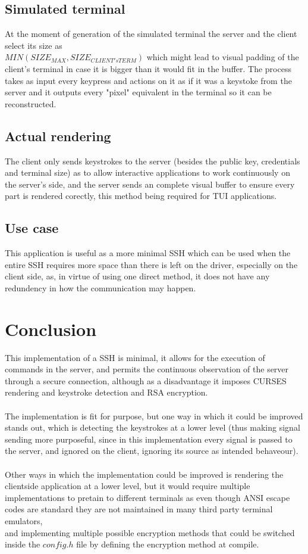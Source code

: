 \documentclass{article}
\begin{document}
    \subsection{Simulated terminal} 
    At the moment of generation of the simulated terminal the server and the client select its size as \\$MIN(SIZE_{MAX}, SIZE_{CLIENT'sTERM})$ which might lead to visual padding of the client's terminal in case it is bigger than it would fit in the buffer. 
    The process takes as input every keypress and actions on it as if it was a keystoke from the server and it outputs every "pixel" equivalent in the terminal so it can be reconstructed.
    \subsection{Actual rendering}
    The client only sends keystrokes to the server (besides the public key, credentials and terminal size) as to allow interactive applications to work continuously on the server's side, and the server sends an complete visual buffer to ensure every part is rendered corectly, this method being required for TUI applications.
    \subsection{Use case}
    This application is useful as a more minimal SSH which can be used when the entire SSH requires more space than there is left on the driver, especially on the client side, as, in virtue of using one direct method, it does not have any redundency in how the communication may happen.

    \section{Conclusion}
    This implementation of a SSH is minimal, it allows for the execution of commands in the server, and permits the continuous observation of the server through a secure connection, although as a disadvantage it imposes CURSES rendering and keystroke detection and RSA encryption.\\
    \\The implementation is fit for purpose, but one way in which it could be improved stands out, which is detecting the keystrokes at a lower level (thus making signal sending more purposeful, since in this implementation every signal is passed to the server, and ignored on the client, ignoring its source as intended behaveour). \\
    \\Other ways in which the implementation could be improved is rendering the clientside application at a lower level, but it would require multiple implementations to pretain to different terminals as even though ANSI escape codes are standard they are not maintained in many third party terminal emulators, \\
    and implementing multiple possible encryption methods that could be switched inside the $config.h$ file by defining the encryption method at compile.
\end{document}
